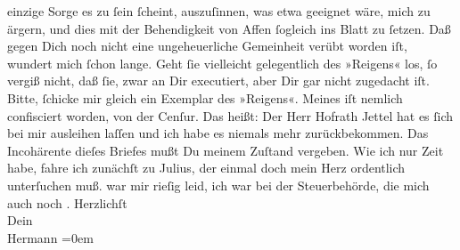 \begin{ledgroupsized}[t]{13cm}
               einzige Sorge es zu ſein ſcheint, auszuſinnen, was etwa geeignet wäre, mich zu
               ärgern, und dies mit der Behendigkeit von Affen ſogleich ins Blatt zu ſetzen. Daß
               gegen Dich noch nicht eine ungeheuerliche Gemeinheit verübt worden iſt, wundert mich
               ſchon lange. Geht ſie vielleicht gelegentlich des »Reigens« los, ſo vergiß nicht, daß ſie, zwar an Dir executiert, aber Dir gar
               nicht zugedacht iſt.\pend
           \pstart
           Bitte, ſchicke mir gleich ein Exemplar des »Reigens«. Meines iſt nemlich confisciert {\pb}worden, von der Cenſur. Das heißt: Der Herr Hofrath Jettel hat es ſich bei mir ausleihen laſſen und ich habe es
               niemals mehr zurückbekommen.\pend
           \pstart
           Das Incohärente dieſes Briefes mußt Du meinem Zuſtand vergeben. Wie ich nur Zeit
               habe, fahre ich zunächſt zu Julius, der einmal
               doch mein Herz ordentlich unterſuchen muß.\pend
           \pstart
           \label{K_L01282_5v}\label{K_L01282_5h} war mir rieſig leid, ich war bei der Steuerbehörde, die mich auch noch
                  \label{K_L01282_6v}\label{K_L01282_6h}.\pend
           \pstart
           Herzlichſt{\\[\baselineskip]}Dein{\\[\baselineskip]}\spacefill\mbox{Hermann}\pend
           \leftskip=0em{}\endnumbering{}\end{ledgroupsized}  \newcommand{\dateiname}{L01282}\newcommand{\titel}{Hermann Bahr an Arthur Schnitzler, [29. 3. 1903?]}\newcommand{\editorInnen}{ Kurt Ifkovits,  Martin Anton Müller}
      